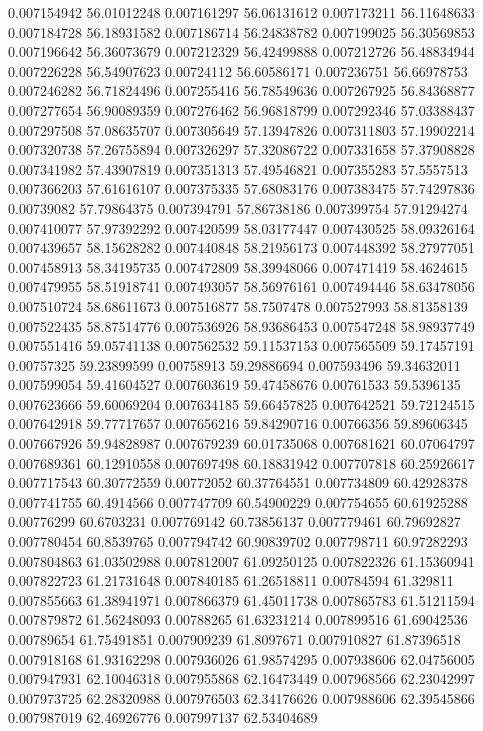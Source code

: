 0.007154942	56.01012248
0.007161297	56.06131612
0.007173211	56.11648633
0.007184728	56.18931582
0.007186714	56.24838782
0.007199025	56.30569853
0.007196642	56.36073679
0.007212329	56.42499888
0.007212726	56.48834944
0.007226228	56.54907623
0.00724112	56.60586171
0.007236751	56.66978753
0.007246282	56.71824496
0.007255416	56.78549636
0.007267925	56.84368877
0.007277654	56.90089359
0.007276462	56.96818799
0.007292346	57.03388437
0.007297508	57.08635707
0.007305649	57.13947826
0.007311803	57.19902214
0.007320738	57.26755894
0.007326297	57.32086722
0.007331658	57.37908828
0.007341982	57.43907819
0.007351313	57.49546821
0.007355283	57.5557513
0.007366203	57.61616107
0.007375335	57.68083176
0.007383475	57.74297836
0.00739082	57.79864375
0.007394791	57.86738186
0.007399754	57.91294274
0.007410077	57.97392292
0.007420599	58.03177447
0.007430525	58.09326164
0.007439657	58.15628282
0.007440848	58.21956173
0.007448392	58.27977051
0.007458913	58.34195735
0.007472809	58.39948066
0.007471419	58.4624615
0.007479955	58.51918741
0.007493057	58.56976161
0.007494446	58.63478056
0.007510724	58.68611673
0.007516877	58.7507478
0.007527993	58.81358139
0.007522435	58.87514776
0.007536926	58.93686453
0.007547248	58.98937749
0.007551416	59.05741138
0.007562532	59.11537153
0.007565509	59.17457191
0.00757325	59.23899599
0.00758913	59.29886694
0.007593496	59.34632011
0.007599054	59.41604527
0.007603619	59.47458676
0.00761533	59.5396135
0.007623666	59.60069204
0.007634185	59.66457825
0.007642521	59.72124515
0.007642918	59.77717657
0.007656216	59.84290716
0.00766356	59.89606345
0.007667926	59.94828987
0.007679239	60.01735068
0.007681621	60.07064797
0.007689361	60.12910558
0.007697498	60.18831942
0.007707818	60.25926617
0.007717543	60.30772559
0.00772052	60.37764551
0.007734809	60.42928378
0.007741755	60.4914566
0.007747709	60.54900229
0.007754655	60.61925288
0.00776299	60.6703231
0.007769142	60.73856137
0.007779461	60.79692827
0.007780454	60.8539765
0.007794742	60.90839702
0.007798711	60.97282293
0.007804863	61.03502988
0.007812007	61.09250125
0.007822326	61.15360941
0.007822723	61.21731648
0.007840185	61.26518811
0.00784594	61.329811
0.007855663	61.38941971
0.007866379	61.45011738
0.007865783	61.51211594
0.007879872	61.56248093
0.00788265	61.63231214
0.007899516	61.69042536
0.00789654	61.75491851
0.007909239	61.8097671
0.007910827	61.87396518
0.007918168	61.93162298
0.007936026	61.98574295
0.007938606	62.04756005
0.007947931	62.10046318
0.007955868	62.16473449
0.007968566	62.23042997
0.007973725	62.28320988
0.007976503	62.34176626
0.007988606	62.39545866
0.007987019	62.46926776
0.007997137	62.53404689
